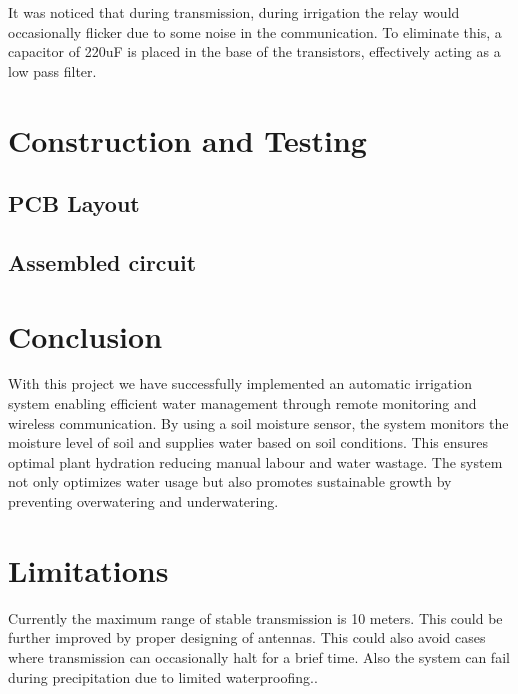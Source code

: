 \documentclass[12pt, a4paper]{report}
\begin{document}
It was noticed that during transmission, during irrigation the relay
would occasionally flicker due to some noise in the communication. To
eliminate this, a capacitor of  220uF is placed in the base of the
transistors, effectively acting as a low pass filter.

\newpage
\chapter{Construction and Testing}
\section{PCB Layout}

\section{Assembled circuit}

\newpage
\chapter{Conclusion}
With this project we have successfully implemented an automatic
irrigation system enabling efficient water management through remote
monitoring and wireless communication. By using a soil moisture
sensor, the system monitors the moisture level of soil and supplies
water based on soil conditions. This ensures optimal plant hydration
reducing manual labour and water wastage. The system not only
optimizes water usage but also promotes sustainable growth by
preventing overwatering and underwatering.

\newpage
\chapter{Limitations}
Currently the maximum range of stable transmission is 10 meters. This
could be further improved by proper designing of antennas. This could
also avoid cases where transmission can occasionally halt for a brief
time. Also the system can fail during precipitation due to limited
waterproofing..

\newpage
\end{document}
